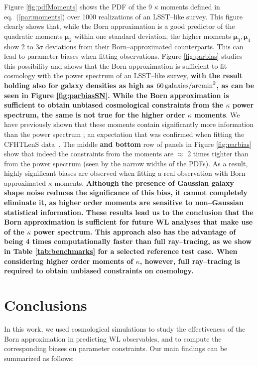 \documentclass[reprint,aps,prd,superscriptaddress,showkeys,showpacs]{revtex4-1}
\begin{document}
Figure \ref{fig:pdfMoments} shows the PDF of the 9 $\kappa$ moments defined in eq.~(\ref{par:moments}) over 1000 realizations of an LSST--like survey. This figure clearly shows that, while the Born approximation is a good predictor of the quadratic moments $\pmb{\mu}_2$ within one standard deviation, the higher moments $\pmb{\mu}_3,\pmb{\mu}_4$ show 2 to 3$\sigma$ deviations from their Born--approximated counterparts. This can lead to parameter biases when fitting observations. Figure \ref{fig:parbias} studies this possibility and shows that the Born approximation is sufficient to fit cosmology with the power spectrum of an LSST--like survey, \textbf{\color{blue} with the result holding also for galaxy densities as high as $60\,{\rm galaxies/arcmin}^2$, as can be seen in Figure \ref{fig:parbiasSN}. While the Born approximation is sufficient to obtain unbiased cosmological constraints from the $\kappa$ power spectrum, the same is not true for the higher order $\kappa$ moments}. We have previously shown that these moments contain significantly more information than the power spectrum \citep{MinkPetri}; an expectation that was confirmed when fitting the CFHTLenS data~\citep{CFHTMink}. The middle \textbf{\color{blue} and bottom} row of panels in Figure \ref{fig:parbias} show that indeed the constraints from the moments are $\approx$ 2 times tighter than from the power spectrum (seen by the narrow widths of the PDFs). As a result, highly significant biases are observed when fitting a real observation with Born--approximated $\kappa$ moments. \textbf{\color{blue} Although the presence of Gaussian galaxy shape noise reduces the significance of this bias, it cannot completely eliminate it, as higher order moments are sensitive to non--Gaussian statistical information. These results lead us to the conclusion that the Born approximation is sufficient for future WL analyses that make use of the $\kappa$ power spectrum. This approach also has the advantage of being 4 times computationally faster than full ray--tracing, as we show in Table \ref{tab:benchmarks} for a selected reference test case. When considering higher order moments of $\kappa$, however, full ray--tracing is required to obtain unbiased constraints on cosmology.}  


\section{Conclusions}
\label{sec:conclude}
%
In this work, we used cosmological simulations to study the effectiveness of the Born approximation in predicting WL observables, and to compute the corresponding biases on parameter constraints. Our main findings can be summarized as follows:
\end{document}
